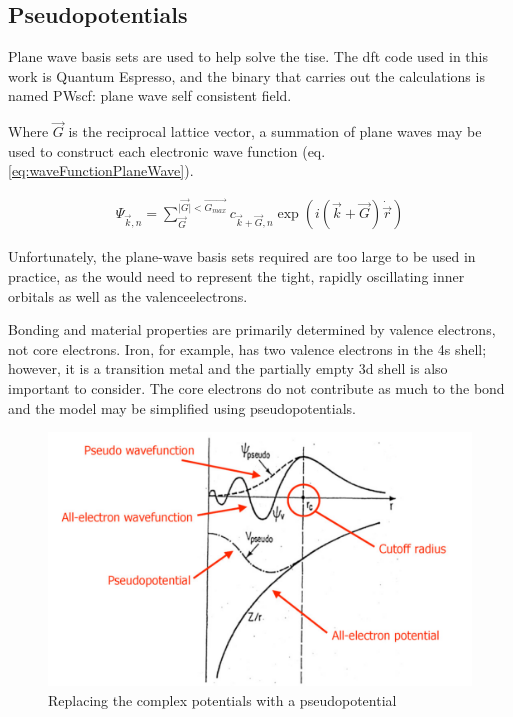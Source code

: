  
\subsection{Pseudopotentials}
\label{section:backgroundpseudopotentials}

Plane wave basis sets are used to help solve the \acrshort{tise}.  The \acrshort{dft} code used in this work is Quantum Espresso, and the binary that carries out the calculations is named PWscf: plane wave self consistent field. 

Where $\vec{G}$ is the reciprocal lattice vector, a summation of plane waves may be used to construct each electronic wave function (eq. \ref{eq:waveFunctionPlaneWave})\cite{paynedftreview}.

\begin{equation}
  \begin{split}
  \Psi_{\vec{k}, n} = \sum_{\vec{G}}^{\lvert \vec{G} \rvert < \vec{G_{max}}} c_{\vec{k} + \vec{G}, n} \exp(i(\vec{k} + \vec{G}) \dot \vec{r})
  \end{split}
  \label{eq:waveFunctionPlaneWave}
\end{equation}

Unfortunately, the plane-wave basis sets required are too large to be used in practice, as the would need to represent the tight, rapidly oscillating inner orbitals as well as the \gls{valenceelectron}s.

Bonding and material properties are primarily determined by valence electrons, not core electrons.  Iron, for example, has two valence electrons in the 4s shell; however, it is a transition metal and the partially empty 3d shell is also important to consider.  The core electrons do not contribute as much to the bond and the model may be simplified using pseudopotentials.

\begin{figure}[!htbp]
  \begin{center}
    \includegraphics[width=.4\linewidth]{chapters/interatomic_potential_fitting/images/pp.png}
    \caption{Replacing the complex potentials with a pseudopotential\cite{ppselloni}}
    \label{graph:pseudopotentials}
  \end{center}
\end{figure}

